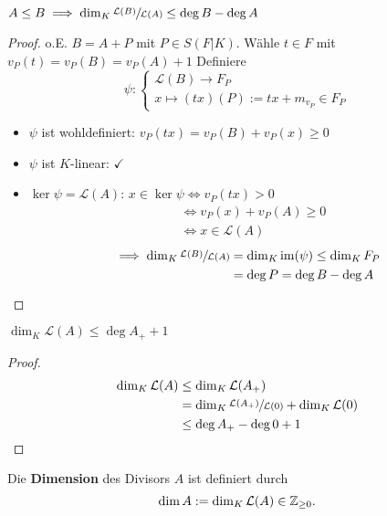 \begin{lemma}
    $A \leq B \implies \dim_K \sfrac{\mathcal{L}(B)}{\mathcal{L}(A)} \leq \deg B - \deg A$
\end{lemma}
\begin{proof}
    o.E. $B=A+P$ mit $P \in S(F|K)$.
    Wähle $t \in F$ mit $v_P(t) = v_P(B) = v_P(A) +1$
    Definiere
    $$ \psi : \begin{cases}
        \mathcal{L}(B) \to F_P\\
        x \mapsto (tx)(P) := tx + m_{v_P} \in F_P
    \end{cases}$$
    \begin{itemize}
        \item $\psi$ ist wohldefiniert: $v_P(tx) = v_P(B) + v_P(x) \geq 0$
        \item $\psi$ ist $K$-linear: $\checkmark$
        \item $\ker \psi = \mathcal{L}(A)$: $x \in \ker \psi \iff v_P(tx) > 0$
        \begin{align*}
            & \iff v_P(x) + v_P(A) \geq 0\\
            & \iff x \in \mathcal{L}(A)
        \end{align*}
        \begin{align*}
            \implies \dim_K \sfrac{\mathcal{L}(B)}{\mathcal{L}(A)} &= \dim_K \operatorname{im} (\psi) \leq \dim_K F_P\\
                & = \deg P = \deg B - \deg A
        \end{align*}
    \end{itemize}
\end{proof}

\begin{satz}
    $\dim_K \mathcal{L}(A) \leq \deg A_+ + 1$
\end{satz}
\begin{proof}
    \begin{align*}
        \dim_K \mathcal{L}(A) &\leq \dim_K \mathcal{L}(A_+)\\
        & = \dim_K \sfrac{\mathcal{L}(A_+)}{\mathcal{L}(0)} + \dim_K \mathcal{L}(0)\\
        & \leq \deg A_+ - \deg 0 + 1
    \end{align*}
\end{proof}

\begin{definition}
    Die \textbf{Dimension} des Divisors $A$ ist definiert durch
    $$ \dim A := \dim_K \mathcal{L}(A) \in \mathbb{Z}_{\geq 0}.$$
\end{definition}

